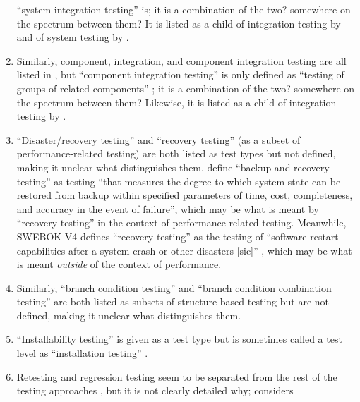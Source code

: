 \begin{enumerate}
            ``system integration testing'' is; it is a combination of the two?
            somewhere on the spectrum between them? It is listed as a child
            of integration testing by  and of system testing
            by \citet[p.~23]{Firesmith2015}.
      \item Similarly, component, integration, and component integration
            testing are all listed in \citep{IEEE2017}, but ``component
            integration testing'' is only defined as ``testing of groups of
            related components'' \citep[p.~82]{IEEE2017}; it is a combination of
            the two? somewhere on the spectrum between them? Likewise, it is
            listed as a child of integration testing by .
      \item ``Disaster/recovery testing'' and ``recovery testing'' (as a subset
            of performance-related testing) are both listed as test types
            \citep[p.~22]{IEEE2022} but not defined, making it unclear what
            distinguishes them. \citet[p.~2]{IEEE2013} define ``backup and
            recovery testing'' as  testing ``that measures the degree to which
            system state can be restored from backup within specified parameters
            of time, cost, completeness, and accuracy in the event of failure'',
            which may be what is meant by ``recovery
            testing'' in the context of performance-related testing.
            Meanwhile, SWEBOK V4 defines ``recovery testing'' as the testing of
            ``software restart capabilities after a system crash or other
            disasters [sic]'' \citep[p.~5-9]{SWEBOK2024}, which may be what is
            meant \emph{outside} of the context of performance.
      \item Similarly, ``branch condition testing'' and ``branch condition combination
            testing'' are both listed as subsets of structure-based testing
            \citep[p.~22]{IEEE2022} but are not defined, making it unclear what
            distinguishes them.
      \item ``Installability testing'' is given as a test type
            \citep[p.~22]{IEEE2022} but is sometimes called a test level as
            ``installation testing'' \citep[p.~445]{PetersAndPedrycz2000}.
      \item Retesting and regression testing seem to be separated from the rest
            of the testing approaches \citep[p.~23]{IEEE2022}, but it is not
            clearly detailed why; \citet[p.~3]{BarbosaEtAl2006} considers

\end{enumerate}
